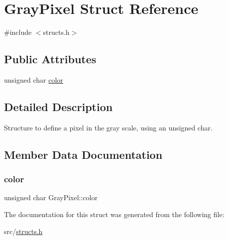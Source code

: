 \hypertarget{structGrayPixel}{}\section{Gray\+Pixel Struct Reference}
\label{structGrayPixel}


{\ttfamily \#include $<$structs.\+h$>$}

\subsection*{Public Attributes}
\begin{DoxyCompactItemize}
\item 
unsigned char \hyperlink{structGrayPixel_a77f0959601895486bddb03723a938903}{color}
\end{DoxyCompactItemize}


\subsection{Detailed Description}
Structure to define a pixel in the gray scale, using an unsigned char. 

\subsection{Member Data Documentation}
\mbox{\label{structGrayPixel_a77f0959601895486bddb03723a938903}} 
\subsubsection{\texorpdfstring{color}{color}}
{\footnotesize\ttfamily unsigned char Gray\+Pixel\+::color}



The documentation for this struct was generated from the following file\+:\begin{DoxyCompactItemize}
\item 
src/\hyperlink{structs_8h}{structs.\+h}\end{DoxyCompactItemize}
